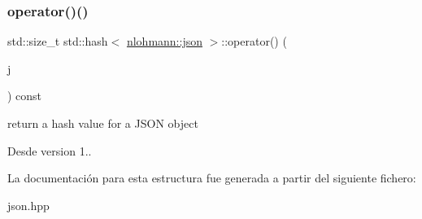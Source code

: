 \subsubsection{\texorpdfstring{operator()()}{operator()()}}
{\footnotesize\ttfamily std\+::size\+\_\+t std\+::hash$<$ \mbox{\hyperlink{namespacenlohmann_a2bfd99e845a2e5cd90aeaf1b1431f474}{nlohmann\+::json}} $>$\+::operator() (\begin{DoxyParamCaption}\item[{const \mbox{\hyperlink{namespacenlohmann_a2bfd99e845a2e5cd90aeaf1b1431f474}{nlohmann\+::json}} \&}]{j }\end{DoxyParamCaption}) const\hspace{0.3cm}{\ttfamily [inline]}}



return a hash value for a J\+S\+ON object 

\begin{DoxySince}{Desde}
version 1.. 
\end{DoxySince}


La documentación para esta estructura fue generada a partir del siguiente fichero\+:\begin{DoxyCompactItemize}
\item 
json.\+hpp\end{DoxyCompactItemize}

